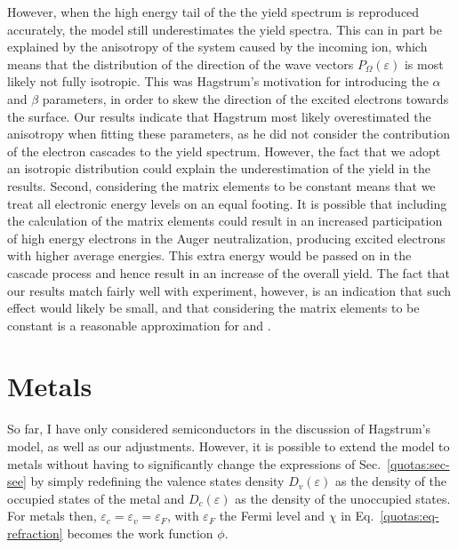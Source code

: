 \begin{refsection}
However, when the high energy tail of the the yield spectrum is reproduced 
accurately, the model still underestimates the yield spectra. This can in part 
be explained by the anisotropy of the system caused by the incoming ion, which 
means that the distribution of the direction of the wave vectors 
$P_\Omega(\varepsilon)$ is most likely not fully isotropic. This was 
Hagstrum's motivation for introducing the $\alpha$ and $\beta$ parameters, in 
order to skew the direction of the excited electrons towards the surface. Our 
results indicate that Hagstrum most likely overestimated the anisotropy when 
fitting these parameters, as he did not consider the contribution of the 
electron cascades to the yield spectrum. However, the fact that we adopt an 
isotropic distribution could explain the underestimation of the yield in the 
results. Second, considering the matrix elements to be constant means that we 
treat all electronic energy levels on an equal footing. It is possible that 
including the calculation of the matrix elements could result in an increased 
participation of high energy electrons in the Auger neutralization, producing 
excited electrons with higher average energies. This extra energy would be 
passed on in the cascade process and hence result in an increase of the 
overall yield. The fact that our results match fairly well with experiment, 
however, is an indication that such effect would likely be small, and that 
considering the matrix elements to be constant is a reasonable approximation 
for  and . 
 
\section{Metals} \label{quotas:sec-metals} 
 
So far, I have only considered semiconductors in the discussion of Hagstrum's 
model, as well as our adjustments. However, it is possible to extend the model 
to metals without having to significantly change the expressions of 
Sec.~\ref{quotas:sec-see} by simply redefining the valence states density 
$D_v(\varepsilon)$ as the density of the occupied states of the metal and 
$D_c(\varepsilon)$ as the density of the unoccupied states. For metals then, 
$\varepsilon_c = \varepsilon_v = \varepsilon_F$, with $\varepsilon_F$ the 
Fermi level and $\chi$ in Eq.~\ref{quotas:eq-refraction} becomes the work 
function $\phi$. 
 

\end{refsection}
